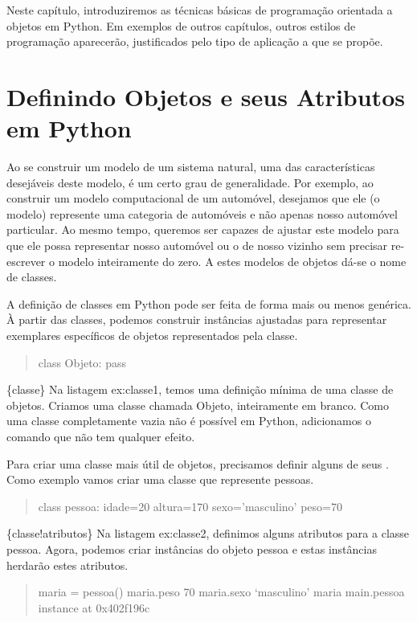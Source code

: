 \documentclass[a4paper,10pt,portuguese]{sphinxmanual}
\begin{document}
Neste capítulo, introduziremos as técnicas básicas de programação
orientada a objetos em Python. Em exemplos de outros capítulos,
outros estilos de programação aparecerão, justificados pelo tipo de
aplicação a que se propõe.


\section{Definindo Objetos e seus Atributos em Python}
\label{CapObj:definindo-objetos-e-seus-atributos-em-python}
Ao se construir um modelo de um sistema natural, uma das
características desejáveis deste modelo, é um certo grau de
generalidade. Por exemplo, ao construir um modelo computacional de
um automóvel, desejamos que ele (o modelo) represente uma categoria
de automóveis e não apenas nosso automóvel particular. Ao mesmo
tempo, queremos ser capazes de ajustar este modelo para que ele
possa representar nosso automóvel ou o de nosso vizinho sem
precisar re-escrever o modelo inteiramente do zero. A estes modelos
de objetos dá-se o nome de classes.

A definição de classes em Python pode ser feita de forma mais ou
menos genérica. À partir das classes, podemos construir instâncias
ajustadas para representar exemplares específicos de objetos
representados pela classe.
\begin{quote}

class Objeto: pass
\end{quote}

\{classe\} Na listagem ex:classe1, temos uma definição mínima de uma
classe de objetos. Criamos uma classe chamada Objeto, inteiramente
em branco. Como uma classe completamente vazia não é possível em
Python, adicionamos o comando  que não tem qualquer
efeito.

Para criar uma classe mais útil de objetos, precisamos definir
alguns de seus . Como exemplo vamos criar uma classe
que represente pessoas.
\begin{quote}

class pessoa: idade=20 altura=170 sexo='masculino' peso=70
\end{quote}

\{classe!atributos\} Na listagem ex:classe2, definimos alguns
atributos para a classe pessoa. Agora, podemos criar instâncias do
objeto pessoa e estas instâncias herdarão estes atributos.
\begin{quote}

maria = pessoa() maria.peso 70 maria.sexo `masculino' maria
main.pessoa instance at 0x402f196c
\end{quote}
\end{document}
